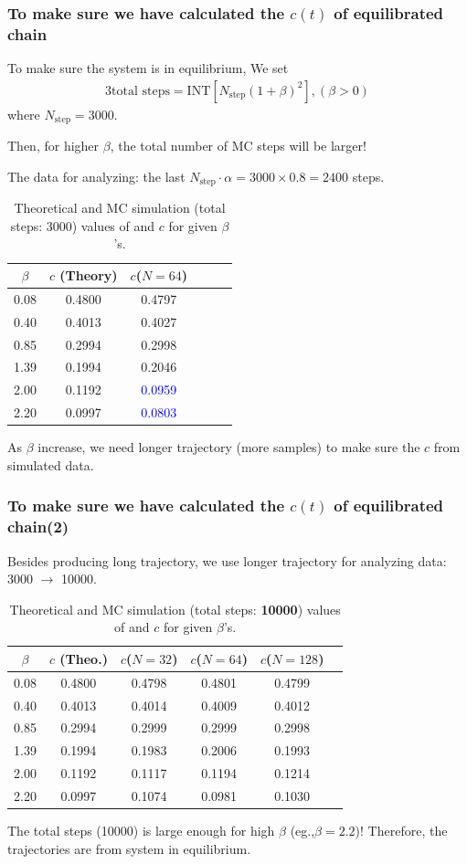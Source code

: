 \documentclass[8pt]{beamer}
\begin{document}
\begin{frame}
	\frametitle{To make sure we have calculated the $c(t)$ of equilibrated chain}
	To make sure the system is in equilibrium,
	We set 
	\begin{alignat}{3}
	\text{total steps} = \text{INT}[N_\text{step} (1+\beta)^2], (\beta > 0)
	\label{tot_steps_seting1} 
	\end{alignat}
where $N_\text{step}=3000$.

	 Then, for higher $\beta$, the total number of MC steps will be larger! 
	 
	 The data for analyzing: the last $N_\text{step}\cdot \alpha = 3000\times 0.8 = 2400$ steps.
\begin{table}[htbp]
	\centering
			\caption{\label{tab:table_lino3} Theoretical and MC simulation (total steps: 3000) values of and $c$ for given $\beta$'s.}
	\begin{tabular}{cccccc}
		$\beta$ & $c$ (Theory)& $c$($N=64$) \\
		\hline
		0.08 & 0.4800  &  0.4797 \\
		0.40 & 0.4013 &  0.4027   \\
		0.85 & 0.2994 &  0.2998   \\
		1.39 & 0.1994 &  0.2046   \\
		2.00 & 0.1192 &  \textcolor{blue}{0.0959}  \\
		2.20 & 0.0997 & \textcolor{blue}{0.0803}  
	\end{tabular}
\end{table}
As $\beta$ increase, we need longer trajectory (more samples) to make sure the $c$ from simulated data. 
\end{frame}

\begin{frame}
	\frametitle{To make sure we have calculated the $c(t)$ of equilibrated chain(2)}
	Besides producing long trajectory, we use longer trajectory for analyzing data:\\
	  3000 $\to$  10000.
	
	\begin{table}[htbp]
		\centering
		\caption{\label{tab:table_lino3} Theoretical and MC simulation (total steps: \textbf{10000}) values of and $c$ for given $\beta$'s.}
		\begin{tabular}{cccccc}
			$\beta$ & $c$ (Theo.) & $c$($N=32$) & $c$($N=64$) & $c$($N=128$) \\
			\hline
			0.08 & 0.4800  & 0.4798 &  0.4801 & 0.4799  \\
			0.40 & 0.4013 & 0.4014 &   0.4009 & 0.4012  \\
			0.85 & 0.2994 & 0.2999 &  0.2999 & 0.2998 \\
			1.39 & 0.1994 & 0.1983 &  0.2006 & 0.1993  \\
			2.00 & 0.1192 & 0.1117 & 0.1194 & 0.1214 \\
			2.20 & 0.0997 & 0.1074 & 0.0981 & 0.1030 
		\end{tabular}
	\end{table}
The total steps (10000) is large enough for high $\beta$ (eg.,$\beta=2.2$)!  Therefore, the trajectories are from system in equilibrium.
\end{frame}
\end{document}
